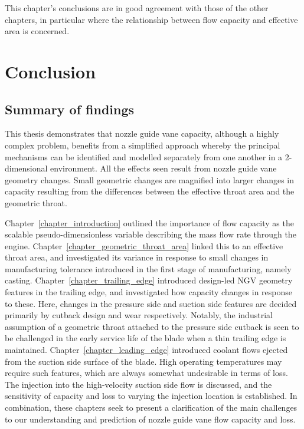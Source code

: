\documentclass[a4paper, 11pt, oneside]{report}
\begin{document}
This chapter's conclusions are in good agreement with those of the other chapters, in particular where the relationship between flow capacity and effective area is concerned. 



\chapter{Conclusion}

\section{Summary of findings}

This thesis demonstrates that nozzle guide vane capacity, although a highly complex problem, benefits from a simplified approach whereby the principal mechanisms can be identified and modelled separately from one another in a 2-dimensional environment. All the effects seen result from nozzle guide vane geometry changes. Small geometric changes are magnified into larger changes in capacity resulting from the differences between the effective throat area and the geometric throat.

Chapter~\ref{chapter_introduction} outlined the importance of flow capacity as the scalable pseudo-dimensionless variable describing the mass flow rate through the engine. Chapter~\ref{chapter_geometric_throat_area} linked this to an effective throat area, and investigated its variance in response to small changes in manufacturing tolerance introduced in the first stage of manufacturing, namely casting. Chapter~\ref{chapter_trailing_edge} introduced design-led NGV geometry features in the trailing edge, and investigated how capacity changes in response to these. Here, changes in the pressure side and suction side features are decided primarily by cutback design and wear respectively. Notably, the industrial assumption of a geometric throat attached to the pressure side cutback is seen to be challenged in the early service life of the blade when a thin trailing edge is maintained.  Chapter~\ref{chapter_leading_edge} introduced coolant flows ejected from the suction side surface of the blade.  High operating temperatures may require such features, which are always somewhat undesirable in terms of loss. The injection into the high-velocity suction side flow is discussed, and the sensitivity of capacity and loss to varying the injection location is established. In combination, these chapters seek to present a clarification of the main challenges to our understanding and prediction of nozzle guide vane flow capacity and loss.
\end{document}
